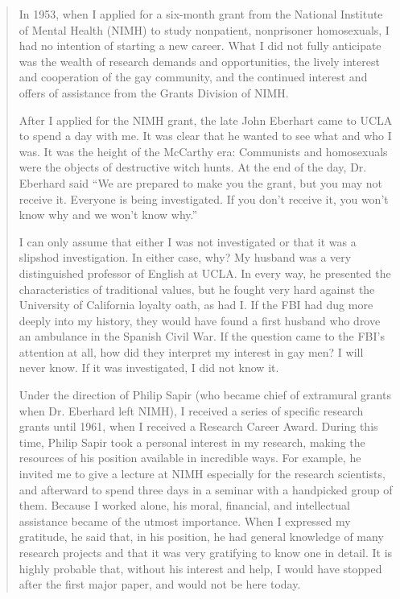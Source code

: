 \begin{refsection}
\begin{quote}

In 1953, when I applied for a six-month grant from the National Institute of Mental Health (NIMH) to study nonpatient, nonprisoner homosexuals, I had no intention of starting a new career. What I did not fully anticipate was the wealth of research demands and opportunities, the lively interest and cooperation of the gay community, and the continued interest and offers of assistance from the Grants Division of NIMH.

After I applied for the NIMH grant, the late John Eberhart came to UCLA to spend a day with me. It was clear that he wanted to see what and who I was. It was the height of the McCarthy era: Communists and homosexuals were the objects of destructive witch hunts. At the end of the day, Dr. Eberhard said ``We are prepared to make you the grant, but you may not receive it. Everyone is being investigated. If you don't receive it, you won't know why and we won't know why.''

I can only assume that either I was not investigated or that it was a slipshod investigation. In either case, why? My husband was a very distinguished professor of English at UCLA. In every way, he presented the characteristics of traditional values, but he fought very hard against the University of California loyalty oath, as had I. If the FBI had dug more deeply into my history, they would have found a first husband who drove an ambulance in the Spanish Civil War. If the question came to the FBI's attention at all, how did they interpret my interest in gay men? I will never know. If it was investigated, I did not know it.

Under the direction of Philip Sapir (who became chief of extramural grants when Dr. Eberhard left NIMH), I received a series of specific research grants until 1961, when I received a Research Career Award. During this time, Philip Sapir took a personal interest in my research, making the resources of his position available in incredible ways. For example, he invited me to give a lecture at NIMH especially for the research scientists, and afterward to spend three days in a seminar with a handpicked group of them. Because I worked alone, his moral, financial, and intellectual assistance became of the utmost importance. When I expressed my gratitude, he said that, in his position, he had general knowledge of many research projects and that it was very gratifying to know one in detail. It is highly probable that, without his interest and help, I would have stopped after the first major paper, and would not be here today.


\end{quote}
\end{refsection}
